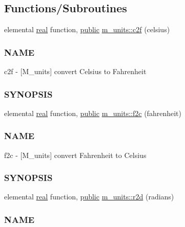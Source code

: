 \subsection*{Functions/\+Subroutines}
\begin{DoxyCompactItemize}
\item 
elemental \hyperlink{read__watch_83_8txt_abdb62bde002f38ef75f810d3a905a823}{real} function, \hyperlink{M__stopwatch_83_8txt_a2f74811300c361e53b430611a7d1769f}{public} \hyperlink{namespacem__units_a652a2565824ce7cbc692b563054ffa3e}{m\+\_\+units\+::c2f} (celsius)
\begin{DoxyCompactList}\small\item\em \subsubsection*{N\+A\+ME}

c2f -\/ \mbox{[}M\+\_\+units\mbox{]} convert Celsius to Fahrenheit \subsubsection*{S\+Y\+N\+O\+P\+S\+IS}\end{DoxyCompactList}\item 
elemental \hyperlink{read__watch_83_8txt_abdb62bde002f38ef75f810d3a905a823}{real} function, \hyperlink{M__stopwatch_83_8txt_a2f74811300c361e53b430611a7d1769f}{public} \hyperlink{namespacem__units_a8f71442bfefc89e6e4636f3a4677b796}{m\+\_\+units\+::f2c} (fahrenheit)
\begin{DoxyCompactList}\small\item\em \subsubsection*{N\+A\+ME}

f2c -\/ \mbox{[}M\+\_\+units\mbox{]} convert Fahrenheit to Celsius \subsubsection*{S\+Y\+N\+O\+P\+S\+IS}\end{DoxyCompactList}\item 
elemental \hyperlink{read__watch_83_8txt_abdb62bde002f38ef75f810d3a905a823}{real} function, \hyperlink{M__stopwatch_83_8txt_a2f74811300c361e53b430611a7d1769f}{public} \hyperlink{namespacem__units_a2fbd26061a0f20c800791796ce183475}{m\+\_\+units\+::r2d} (radians)
\begin{DoxyCompactList}\small\item\em \subsubsection*{N\+A\+ME}


\end{DoxyCompactList}
\end{DoxyCompactItemize}
